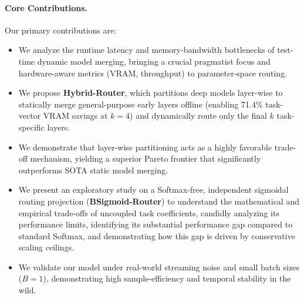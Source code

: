\paragraph{Core Contributions.} Our primary contributions are:
\begin{itemize}
    \item We analyze the runtime latency and memory-bandwidth bottlenecks of test-time dynamic model merging, bringing a crucial pragmatist focus and hardware-aware metrics (VRAM, throughput) to parameter-space routing.
    \item We propose \textbf{Hybrid-Router}, which partitions deep models layer-wise to statically merge general-purpose early layers offline (enabling 71.4\% task-vector VRAM savings at $k=4$) and dynamically route only the final $k$ task-specific layers.
    \item We demonstrate that layer-wise partitioning acts as a highly favorable trade-off mechanism, yielding a superior Pareto frontier that significantly outperforms SOTA static model merging.
    \item We present an exploratory study on a Softmax-free, independent sigmoidal routing projection (\textbf{BSigmoid-Router}) to understand the mathematical and empirical trade-offs of uncoupled task coefficients, candidly analyzing its performance limits, identifying its substantial performance gap compared to standard Softmax, and demonstrating how this gap is driven by conservative scaling ceilings.
    \item We validate our model under real-world streaming noise and small batch sizes ($B=1$), demonstrating high sample-efficiency and temporal stability in the wild.
\end{itemize}
